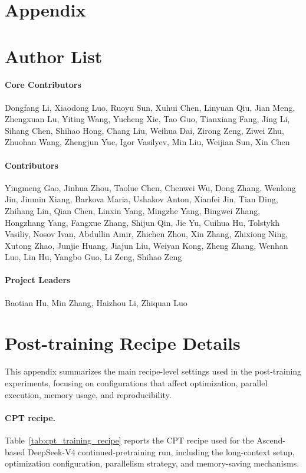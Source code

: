 \section*{Appendix}
\setcounter{section}{0}
\setcounter{subsection}{0}

\section{Author List}

\paragraph*{Core Contributors} Dongfang Li, Xiaodong Luo, Ruoyu Sun, Xuhui Chen, Linyuan Qiu, Jian Meng, Zhengxuan Lu, Yiting Wang, Yucheng Xie, Tao Guo, Tianxiang Fang, Jing Li, Sihang Chen, Shihao Hong, Chang Liu, Weihua Dai, Zirong Zeng, Ziwei Zhu, Zhuohan Wang, Zhengjun Yue, Igor Vasilyev, Min Liu, Weijian Sun,  Xin Chen 
\paragraph*{Contributors} Yingmeng Gao, Jinhua Zhou, Taolue Chen, Chenwei Wu, Dong Zhang, Wenlong Jin, Jinmin Xiang, Barkova Maria, Ushakov Anton, Xianfei Jin, Tian Ding, Zhihang Lin, Qian Chen, Linxin Yang, Mingzhe Yang, Bingwei Zhang, Hongzhang Yang, Fangxue Zhang, Shijun Qin, Jie Yu, Cuihua Hu, Tolstykh Vasiliy, Nosov Ivan, Abdullin Amir, Zhichen Zhou, Xin Zhang, Zhixiong Ning, Xutong Zhao, Junjie Huang, Jiajun Liu, Weiyan Kong, Zheng Zhang, Wenhan Luo, Lin Hu, Yangbo Guo, Li Zeng, Shihao Zeng 
\paragraph*{Project Leaders} Baotian Hu, Min Zhang, Haizhou Li, Zhiquan Luo




\section{Post-training Recipe Details} \label{app:post_training_recipes} This appendix summarizes the main recipe-level settings used in the post-training experiments, focusing on configurations that affect optimization, parallel execution, memory usage, and reproducibility.

\paragraph{CPT recipe.} Table~\ref{tab:cpt_training_recipe} reports the CPT recipe used for the Ascend-based DeepSeek-V4 continued-pretraining run, including the long-context setup, optimization configuration, parallelism strategy, and memory-saving mechanisms.



